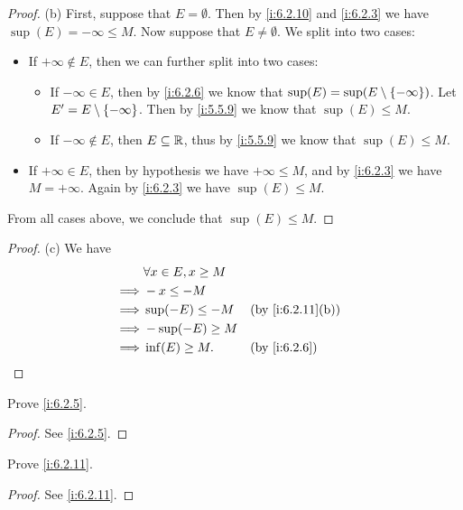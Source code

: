 \begin{proof}{(b)}
  First, suppose that \(E = \emptyset\).
  Then by \cref{i:6.2.10} and \cref{i:6.2.3} we have \(\sup(E) = -\infty \leq M\).
  Now suppose that \(E \neq \emptyset\).
  We split into two cases:
  \begin{itemize}
    \item If \(+\infty \not\in E\), then we can further split into two cases:
          \begin{itemize}
            \item If \(-\infty \in E\), then by \cref{i:6.2.6} we know that \(\sup(E) = \sup(E \setminus \left\lbrace-\infty\right\rbrace)\).
                  Let \(E' = E \setminus \left\lbrace-\infty\right\rbrace\).
                  Then by \cref{i:5.5.9} we know that \(\sup(E) \leq M\).
            \item If \(-\infty \notin E\), then \(E \subseteq \mathbb{R}\), thus by \cref{i:5.5.9} we know that \(\sup(E) \leq M\).
          \end{itemize}
    \item If \(+\infty \in E\), then by hypothesis we have \(+\infty \leq M\), and by \cref{i:6.2.3} we have \(M = +\infty\).
          Again by \cref{i:6.2.3} we have \(\sup(E) \leq M\).
  \end{itemize}
  From all cases above, we conclude that \(\sup(E) \leq M\).
\end{proof}

\begin{proof}{(c)}
  We have
  \begin{align*}
             & \forall x \in E, x \geq M                       \\
    \implies & -x \leq -M                                      \\
    \implies & \sup(-E) \leq -M          &  & \by{i:6.2.11}[b] \\
    \implies & -\sup(-E) \geq M                                \\
    \implies & \inf(E) \geq M.           &  & \by{i:6.2.6}
  \end{align*}
\end{proof}

\exercisesection

\begin{ex}\label{i:ex:6.2.1}
  Prove \cref{i:6.2.5}.
\end{ex}

\begin{proof}
  See \cref{i:6.2.5}.
\end{proof}

\begin{ex}\label{i:ex:6.2.2}
  Prove \cref{i:6.2.11}.
\end{ex}

\begin{proof}
  See \cref{i:6.2.11}.
\end{proof}
